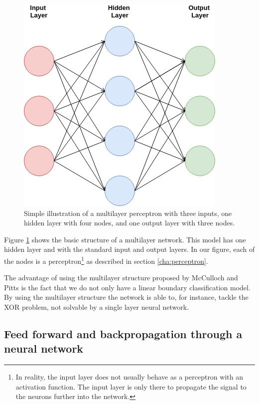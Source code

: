 \begin{figure}[h]
\centering
\includegraphics[scale=0.7]{background/figures/neural_network.png}
\caption{Simple illustration of a multilayer perceptron with three inputs, one hidden layer with four nodes, and one output layer with three nodes.}
\label{fig:mlnn}
\end{figure}


Figure \ref{fig:mlnn} shows the basic structure of a multilayer network. This model has one hidden layer and with the standard input and output layers. In our figure, each of the nodes is a perceptron\footnote{In reality, the input layer does not usually behave as a perceptron with an activation function. The input layer is only there to propagate the signal to the neurons further into the network.} as described in section \ref{cha:perceptron}.

The advantage of using the multilayer structure proposed by McCulloch and Pitts is the fact that we do not only have a linear boundary classification model. By using the multilayer structure the network is able to, for instance, tackle the XOR problem, not solvable by a single layer neural network. 


\subsection{Feed forward and backpropagation through a neural network}


    
